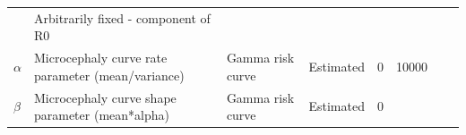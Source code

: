 \documentclass[10pt,letterpaper]{article}
\begin{document}
\begin{longtable}[]{@{}llllllll@{}}
\begin{minipage}[t]{0.14\columnwidth}
\strut
\end{minipage} & \begin{minipage}[t]{0.26\columnwidth}\raggedright\strut
Arbitrarily fixed - component of R0\strut
\end{minipage}\tabularnewline
\begin{minipage}[t]{0.04\columnwidth}\raggedright\strut
\(\alpha\)\strut
\end{minipage} & \begin{minipage}[t]{0.17\columnwidth}\raggedright\strut
Microcephaly curve rate parameter (mean/variance)\strut
\end{minipage} & \begin{minipage}[t]{0.05\columnwidth}\raggedright\strut
Gamma risk curve\strut
\end{minipage} & \begin{minipage}[t]{0.05\columnwidth}\raggedright\strut
Estimated\strut
\end{minipage} & \begin{minipage}[t]{0.04\columnwidth}\raggedright\strut
0\strut
\end{minipage} & \begin{minipage}[t]{0.04\columnwidth}\raggedright\strut
10000\strut
\end{minipage} & \begin{minipage}[t]{0.14\columnwidth}\raggedright\strut
\strut
\end{minipage} & \begin{minipage}[t]{0.26\columnwidth}\raggedright\strut
\strut
\end{minipage}\tabularnewline
\begin{minipage}[t]{0.04\columnwidth}\raggedright\strut
\(\beta\)\strut
\end{minipage} & \begin{minipage}[t]{0.17\columnwidth}\raggedright\strut
Microcephaly curve shape parameter (mean*alpha)\strut
\end{minipage} & \begin{minipage}[t]{0.05\columnwidth}\raggedright\strut
Gamma risk curve\strut
\end{minipage} & \begin{minipage}[t]{0.05\columnwidth}\raggedright\strut
Estimated\strut
\end{minipage} & \begin{minipage}[t]{0.04\columnwidth}\raggedright\strut
0\strut
\end{minipage} & \begin{minipage}[t]{0.04\columnwidth}\raggedright\strut

\end{minipage}
\end{longtable}
\end{document}
